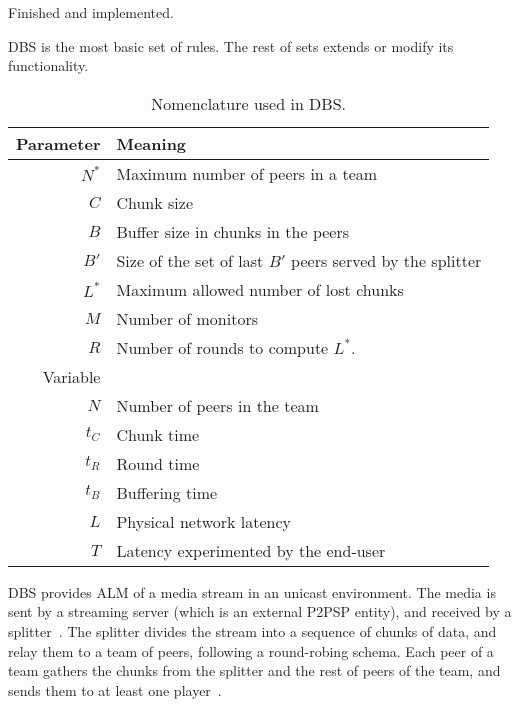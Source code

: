 
\label{sec:DBS}

\begin{notex}
  Finished and implemented.
\end{notex}

\acrshort{DBS} is the most basic set of rules. The rest of sets extends or modify
its functionality.

\begin{table}
  \centering
  \begin{tabular}{rl}
    Parameter & Meaning \\
    \hline
    $N^*$  & Maximum number of peers in a team \\
    $C$    & Chunk size \\
    $B$    & Buffer size in chunks in the peers \\
    $B'$   & Size of the set of last $B'$ peers served by the splitter \\ 
    $L^*$  & Maximum allowed number of lost chunks \\
    $M$    & Number of monitors \\
    $R$    & Number of rounds to compute $L^*$. \\
    Variable & \\
    \hline
    $N$    & Number of peers in the team \\
    $t_C$  & Chunk time \\
    $t_R$  & Round time \\
    $t_B$  & Buffering time \\
    $L$    & Physical network latency \\
    $T$    & Latency experimented by the end-user
  \end{tabular}
  \caption{Nomenclature used in DBS.} %
  \label{tab:DBS_nomenclature}
\end{table}

DBS provides \acrshort{ALM} of a \gls{media} \gls{stream} in an
\gls{unicast} environment. The media is sent by a streaming
\gls{server} (which is an external P2PSP entity), and received by a
\gls{splitter}~. The splitter divides
the stream into a sequence of \gls{chunk}s of data, and relay them to
a \gls{team} of peers, following a round-robing schema. Each peer of a
team gathers the chunks from the splitter and the rest of peers of the
team, and sends them to at least one \gls{player}~.

